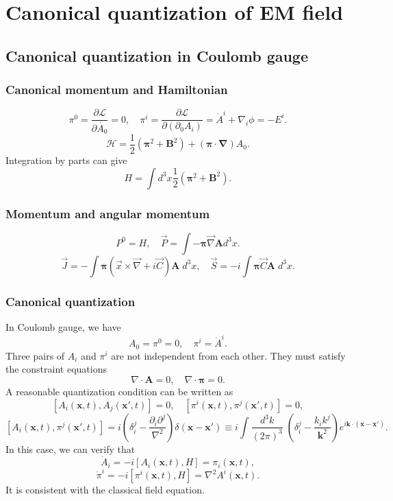 \section{Canonical quantization of EM field}
\subsection{Canonical quantization in Coulomb gauge}

\subsubsection{Canonical momentum and Hamiltonian}
\[\pi^0 = \frac{\partial \mathcal{L}}{\partial \dot{A_0}} = 0 , \quad  \pi^{i} = \frac{\partial \mathcal{L}}{\partial(\partial_0 A_i)} = \dot{A}^i + \nabla_i \phi = -E^i.\]
\[\mathcal{H} = \frac{1}{2}(\bm{\pi}^2 + \bm{B}^2) + (\bm{\pi} \cdot \bm{\nabla}) A_0.\]
Integration by parts can give
\[H = \int d^3x \frac{1}{2}(\bm{\pi}^2 + \bm{B}^2).\]

\subsubsection{Momentum and angular momentum}
\[P^0 = H , \quad \vec{P} = \int - \bm{\pi} \vec{\nabla} \bm{A} d^3x.\]
\[\vec{J} = - \int \bm{\pi} (\vec{x}\times \vec{\nabla} + i \vec{C})\bm{A} \; d^3x , \quad \vec{S} = -i \int \bm{\pi} \vec{C} \bm{A} \; d^3x.\]

\subsubsection{Canonical quantization}
In Coulomb gauge, we have
\[A_0 = \pi^0 = 0 , \quad \pi^i = \dot{A}^i .\]
Three pairs of $A_i$ and $\pi^i$ are not independent from each other. They must satisfy the constraint equations
\[\nabla \cdot \bm{A} = 0 , \quad \nabla \cdot \bm{\pi} = 0.\]
A reasonable quantization condition can be written as
\[[A_i(\bm{x},t),A_j(\bm{x}',t)] = 0 , \quad [\pi^i(\bm{x},t),\pi^j(\bm{x}',t)] = 0,\]
\[[A_i(\bm{x},t),\pi^j(\bm{x}',t)] = i \left( \delta^{j}_i - \frac{\partial_i \partial^j}{\nabla^2} \right) \delta(\bm{x}-\bm{x}') \equiv i \int \frac{d^3k}{(2\pi)^3} \; (\delta^j_i - \frac{k_ik^j}{\bm{k}^2})e^{i\bm{k}\cdot(\bm{x}-\bm{x}')}.\]
In this case, we can verify that
\[\dot{A}_i = -i[A_i(\bm{x},t),H] = \pi_i (\bm{x},t),\]
\[\dot{\pi}^i = -i[\pi^i(\bm{x},t),H] = \nabla^2 A^i(\bm{x},t).\]
It is consistent with the classical field equation.

